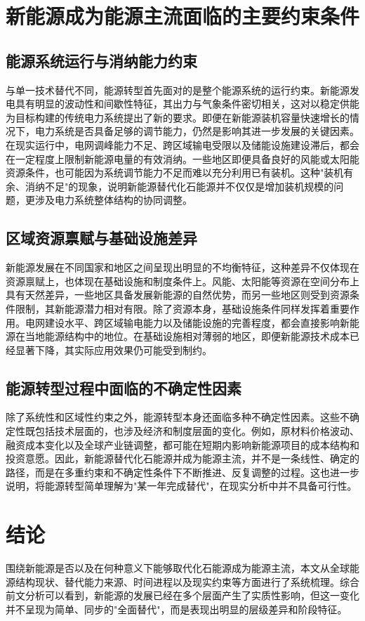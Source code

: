 \documentclass[twocolumn, a4paper, 10pt, UTF8]{ctexart}
\begin{document}
\section{新能源成为能源主流面临的主要约束条件}
\subsection{能源系统运行与消纳能力约束}
与单一技术替代不同，能源转型首先面对的是整个能源系统的运行约束。新能源发电具有明显的波动性和间歇性特征，其出力与气象条件密切相关，这对以稳定供能为目标构建的传统电力系统提出了新的要求。即便在新能源装机容量快速增长的情况下，电力系统是否具备足够的调节能力，仍然是影响其进一步发展的关键因素。在现实运行中，电网调峰能力不足、跨区域输电受限以及储能设施建设滞后，都会在一定程度上限制新能源电量的有效消纳。一些地区即便具备良好的风能或太阳能资源条件，也可能因为系统调节能力不足而难以充分利用已有装机。这种"装机有余、消纳不足"的现象，说明新能源替代化石能源并不仅仅是增加装机规模的问题，更涉及电力系统整体结构的协同调整。

\subsection{区域资源禀赋与基础设施差异}
新能源发展在不同国家和地区之间呈现出明显的不均衡特征，这种差异不仅体现在资源禀赋上，也体现在基础设施和制度条件上。风能、太阳能等资源在空间分布上具有天然差异，一些地区具备发展新能源的自然优势，而另一些地区则受到资源条件限制，其新能源潜力相对有限。除了资源本身，基础设施条件同样发挥着重要作用。电网建设水平、跨区域输电能力以及储能设施的完善程度，都会直接影响新能源在当地能源结构中的地位。在基础设施相对薄弱的地区，即便新能源技术成本已经显著下降，其实际应用效果仍可能受到制约。

\subsection{能源转型过程中面临的不确定性因素}
除了系统性和区域性约束之外，能源转型本身还面临多种不确定性因素。这些不确定性既包括技术层面的，也涉及经济和制度层面的变化。例如，原材料价格波动、融资成本变化以及全球产业链调整，都可能在短期内影响新能源项目的成本结构和投资意愿。因此，新能源替代化石能源并成为能源主流，并不是一条线性、确定的路径，而是在多重约束和不确定性条件下不断推进、反复调整的过程。这也进一步说明，将能源转型简单理解为"某一年完成替代"，在现实分析中并不具备可行性。

\section{结论}
围绕新能源是否以及在何种意义下能够取代化石能源成为能源主流，本文从全球能源结构现状、替代能力来源、时间进程以及现实约束等方面进行了系统梳理。综合前文分析可以看到，新能源的发展已经在多个层面产生了实质性影响，但这一变化并不呈现为简单、同步的"全面替代"，而是表现出明显的层级差异和阶段特征。
\end{document}
